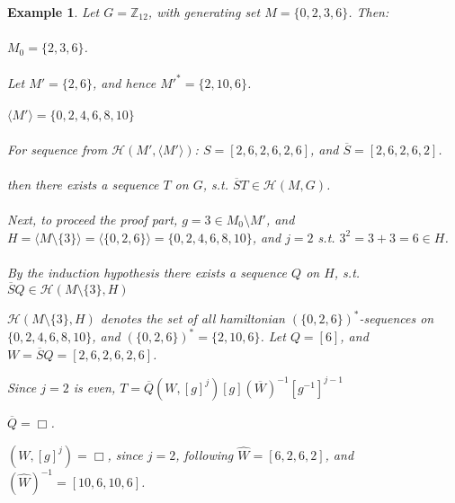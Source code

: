 \documentclass{article}
\newtheorem{example}{Example}
\begin{document}
\begin{example}
Let $G=\mathbb{Z}_{12}$, with generating set $M = \{0, 2, 3, 6\}$. Then:
\paragraph{} 
$M_0 = \{2, 3, 6\}$.
\paragraph{} 
Let $M' = \{2, 6\}$, and hence $M'^* = \{2, 10, 6\}$.
\paragraph{} 
$\langle M'\rangle = \{0, 2, 4, 6, 8, 10\}$
\paragraph{} 
For sequence from $\mathcal{H}(M', \langle M'\rangle)$:
$S = [2, 6, 2, 6, 2, 6]$, and $\overline{S} = [2, 6, 2, 6, 2]$.
\paragraph{} 
then there exists a sequence $T$ on $G$, s.t. 
$\overline{S}T \in \mathcal{H}(M, G)$.

\paragraph{} 
Next, to proceed the proof part, $g=3\in M_0 \setminus M'$, and $H = \langle M \setminus \{3\}\rangle = \langle\{0, 2, 6\}\rangle=\{0, 2, 4, 6, 8, 10\}$, and $j = 2$ s.t. $3^2 = 3+3 = 6\in H$. 

\paragraph{}
By the induction hypothesis there exists a sequence $Q$ on $H$,
s.t. $\overline{S}Q \in \mathcal{H}(M\setminus\{3\}, H)$

$\mathcal{H}(M\setminus\{3\}, H)$ denotes the set of all hamiltonian $(\{0, 2, 6\})^*$-sequences on $\{0, 2, 4, 6, 8, 10\}$, and $(\{0, 2, 6\})^* = \{2, 10, 6\}$. Let $Q=[6]$, and $W=\overline{S}Q = [2, 6, 2, 6, 2, 6]$.

Since $j=2$ is even, $
T =\overline{Q}(W, [g]^j)[g](\overline{W})^{-1}[g^{-1}]^{j-1}
$

$\overline{Q} = \Box$.

$(W, [g]^j) = \Box$, since $j=2$, following $\hat{W} = [6, 2, 6, 2]$, and $(\hat{W})^{-1} = [10, 6, 10, 6]$. 


\end{example}
\end{document}
